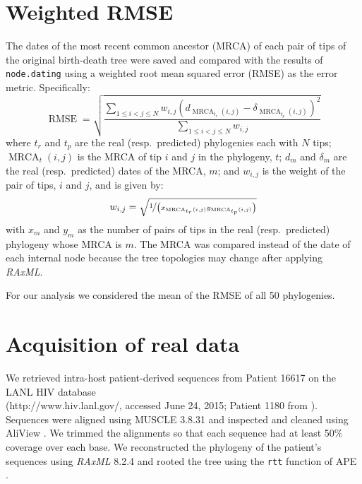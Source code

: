 \documentclass[12pt]{article}
\newcommand{\code}[1]{{\tt #1}}
\begin{document}
\section{Weighted RMSE} \label{sec:rmse}
The dates of the most recent common ancestor (MRCA) of each pair of tips of the original birth-death tree were saved and compared with the results of \code{node.dating} using a weighted root mean squared error (RMSE) as the error metric.
Specifically:
\[\operatorname{RMSE} = \sqrt{\frac{\sum_{1 \leq i < j \leq N}w_{i,j}\left(d_{\operatorname{MRCA}_{t_r}(i,j)} - \delta_{\operatorname{MRCA}_{t_p}(i,j)}\right)^2}{\sum_{1 \leq i < j \leq N}w_{i,j}}}\]
where $t_r$ and $t_p$ are the real (resp.~predicted) phylogenies each with $N$ tips; $\operatorname{MRCA}_t(i, j)$ is the MRCA of tip $i$ and $j$ in the phylogeny, $t$; $d_{m}$ and $\delta_m$ are the real (resp.~predicted) dates of the MRCA, $m$; and $w_{i, j}$ is the weight of the pair of tips, $i$ and $j$, and is given by:
\[w_{i, j} = \sqrt{\nicefrac{1}{\left(x_{\operatorname{MRCA}_{t_r}(i,j)}y_{\operatorname{MRCA}_{t_p}(i,j)}\right)}}\]
with $x_m$ and $y_m$ as the number of pairs of tips in the real (resp.~predicted) phylogeny whose MRCA is $m$.
The MRCA was compared instead of the date of each internal node because the tree topologies may change after applying \emph{RAxML}.

For our analysis we considered the mean of the RMSE of all 50 phylogenies.

\section{Acquisition of real data}
We retrieved intra-host patient-derived sequences from Patient 16617 on the LANL HIV database \\ (http://www.hiv.lanl.gov/, accessed June 24, 2015; Patient 1180 from \cite{Llewellyn06}).
Sequences were aligned using MUSCLE 3.8.31 \citep{Muscle04} and inspected and cleaned using AliView \citep{AliView14}. 
We trimmed the alignments so that each sequence had at least 50\% coverage over each base.
We reconstructed the phylogeny of the patient's sequences using \emph{RAxML} 8.2.4 \citep{Raxml14} and rooted the tree using the \code{rtt} function of APE \citep{APE}.



\end{document}
